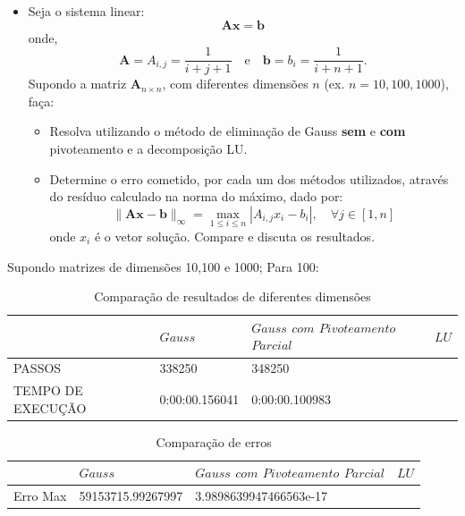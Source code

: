 \documentclass{article}
\newcounter{execs}
\newcommand{\exec}[0]{\addtocounter{execs}{1}\item[\textbf{\arabic{execs}.}]}
\begin{document}
\begin{itemize}
\newpage
\exec Seja o sistema linear:
$$
\mathbf{A}\mathbf{x}=\mathbf{b}
$$
onde,
$$
\mathbf{A} = A_{i,j} = \dfrac{1}{i+j+1} \quad \mbox{e} \quad \mathbf{b}=b_i =\dfrac{1}{i+n+1} .
$$
Supondo a matriz $\mathbf{A}_{n\times n}$, com diferentes dimensões $n$ (ex. $n = 10, 100, 1000$),  faça:

\begin{itemize}
\item Resolva utilizando o método de eliminação de Gauss \textbf{sem} e \textbf{com} pivoteamento e a decomposição LU.

\item Determine o erro cometido, por cada um dos métodos utilizados, através do resíduo calculado na norma do máximo, dado por:
$$
\|\mathbf{A}\mathbf{x} - \mathbf{b}\|_{\infty} = \max_{1\leq i\leq n}|A_{i,j}x_{i} - b_{i}|, \quad \forall j \in [1,n]
$$
onde $x_{i}$ é o vetor solução. Compare e discuta os resultados.

\end{itemize}


\end{itemize}

\text Supondo matrizes de dimensões 10,100 e 1000;
Para 100:
\begin{table}[h]
\centering
  \begin{tabular}{l||l|l|l}
     & $ Gauss$ & $Gauss$ $com$ $Pivoteamento$ $Parcial$ & $LU$ \\
    \hline
    
    PASSOS & 338250 & 348250 & \\
    
    TEMPO DE EXECUÇÃO &  0:00:00.156041 & 0:00:00.100983 & \\
    
    \hline
  \end{tabular}
  \caption{Comparação de resultados de diferentes dimensões}
\end{table}

\begin{table}[h]
\centering
  \begin{tabular}{l||l|l|l}
     & $ Gauss$ & $Gauss$ $com$ $Pivoteamento$ $Parcial$ & $LU$ \\
    \hline
    
    Erro Max & 59153715.99267997 & 3.9898639947466563e-17 & \\
    
    
    \hline
  \end{tabular}
  \caption{Comparação de erros}
\end{table}
\end{document}
